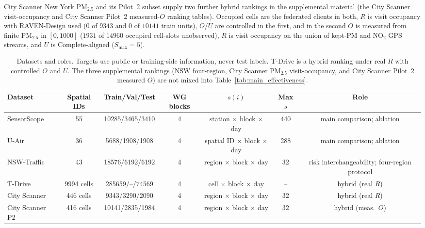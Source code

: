 \documentclass[letterpaper,journal]{IEEEtran}
\begin{document}
City Scanner New York {PM}$_{2.5}$ and its Pilot~2 subset supply two further
hybrid rankings in the supplemental material (the City Scanner visit-occupancy
and City Scanner Pilot~2 measured-$O$ ranking tables).  Occupied cells are the
federated clients in both, $R$ is visit occupancy with RAVEN-Design used ($0$
of $9343$ and $0$ of $10141$ train units), $O$/$U$ are controlled in the first,
and in the second $O$ is measured from finite {PM}$_{2.5}$ in $[0,1000]$
($1931$ of $14960$ occupied cell-slots unobserved), $R$ is visit occupancy on
the union of kept-{PM} and {NO}$_2$ GPS streams, and $U$ is Complete-aligned
($S_{\max}=5$).

\begin{table}[t]
\centering
\caption{Datasets and roles.  Targets use public or training-side
information, never test labels.  T-Drive is a hybrid ranking under real
$R$ with controlled $O$ and $U$.  The three supplemental rankings
(NSW four-region, City Scanner {PM}$_{2.5}$ visit-occupancy, and City Scanner
Pilot~2 measured $O$) are not mixed into Table~\ref{tab:main_effectiveness}.}
\label{tab:datasets}
\scriptsize
\setlength{\tabcolsep}{3.2pt}
\begin{tabular*}{\textwidth}{@{\extracolsep{\fill}}lcccccc}
\toprule
Dataset & Spatial IDs & Train/Val/Test & WG blocks &
$s(i)$ & Max $s$ & Role\\
\midrule
SensorScope~\cite{ingelrest2010sensorscope} & 55 & 10285/3465/3410 & 4 &
station $\times$ block $\times$ day & 440 & main comparison; ablation\\
U-Air~\cite{zheng2013uair} & 36 & 5688/1908/1908 & 4 &
spatial ID $\times$ block $\times$ day & 288 & main comparison; ablation\\
NSW-Traffic~\cite{tfnsw2024traffic} & 43 & 18576/6192/6192 & 4 &
region $\times$ block $\times$ day & 32 & risk interchangeability; four-region protocol\\
T-Drive~\cite{yuan2010tdrive} & 9994 cells & 285659/--/74569 & 4 &
cell $\times$ block $\times$ day & -- & hybrid (real $R$)\\
City Scanner~\cite{wang2023cityscanner} & 446 cells & 9343/3290/2090 & 4 &
region $\times$ block $\times$ day & 32 & hybrid (real $R$)\\
City Scanner P2 & 416 cells & 10141/2835/1984 & 4 &
region $\times$ block $\times$ day & 32 & hybrid (meas.\ $O$)\\
\bottomrule
\end{tabular*}
\end{table}
\end{document}
